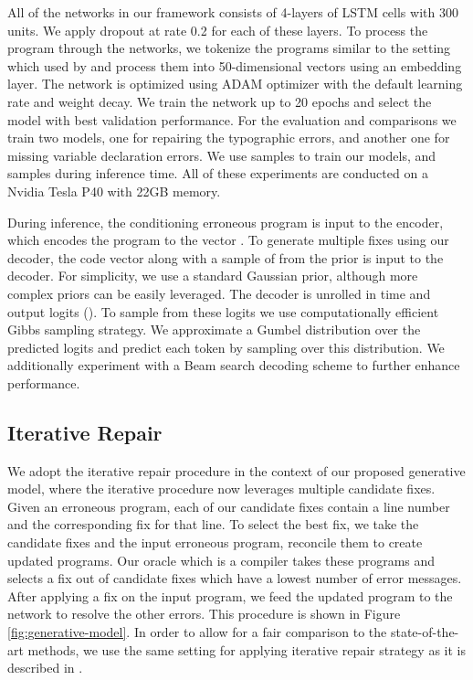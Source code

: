 \documentclass[letterpaper]{article} \usepackage{aaai20}  \usepackage{times}  \usepackage{helvet} \usepackage{courier}  \usepackage[hyphens]{url}  \usepackage{graphicx}
\newcommand{\figref}{Figure}
\begin{document}
All of the networks in our framework consists of 4-layers of LSTM cells with 300 units. We apply dropout at rate 0.2 for each of these layers. To process the program through the networks, we tokenize the programs similar to the setting which used by \citeauthor{Gupta2017DeepFixFC} and process them into 50-dimensional vectors using an embedding layer. The network is optimized using ADAM optimizer \cite{kingma15adam} with the default learning rate and weight decay. We train the network up to 20 epochs and select the model with best validation performance. For the evaluation and comparisons we train two models, one for repairing the typographic errors, and another one for missing variable declaration errors. We use  samples to train our models, and  samples during inference time. All of these experiments are conducted on a Nvidia Tesla P40 with 22GB memory.

During inference, the conditioning erroneous program  is input to the encoder, which encodes the program to the vector . To generate multiple fixes using our decoder, the code vector  along with a sample of  from the prior  is input to the decoder. For simplicity, we use a standard Gaussian   prior, although more complex priors can be easily leveraged. The decoder is unrolled in time and output logits (). To sample from these logits we use computationally efficient Gibbs sampling strategy. We approximate a Gumbel distribution over the predicted logits \cite{jang18gumbel,Maddison2017TheCD} and predict each token by sampling over this distribution. We additionally experiment with a Beam search decoding scheme \cite{deshpande2019fast} to further enhance performance.  

\subsection{Iterative Repair}
We adopt the iterative repair procedure \cite{Gupta2017DeepFixFC} in the context of our proposed generative model, where the iterative procedure now leverages multiple candidate fixes. Given an erroneous program, each of our  candidate fixes contain a line number and the corresponding fix for that line. To select the best fix, we take the candidate fixes and the input erroneous program, reconcile them to create  updated programs. Our oracle which is a compiler takes these programs and selects a fix out of  candidate fixes which have a lowest number of error messages. After applying a fix on the input program, we feed the updated program to the network to resolve the other errors. This procedure is shown in \figref \,\ref{fig:generative-model}. 
In order to allow for a fair comparison to the state-of-the-art methods, we use the same setting for applying iterative repair strategy as it is described in \citeauthor{Gupta2017DeepFixFC}.
\end{document}
